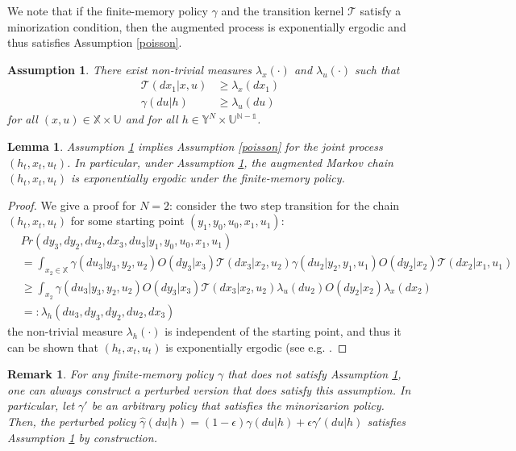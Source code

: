 \documentclass[11pt]{article}
\newtheorem{assumption}{Assumption}
\newtheorem{remark}{Remark}
\newtheorem{lemma}{Lemma}
\begin{document}
We  note that if the finite-memory policy $\gamma$ and the transition kernel $\mathcal{T}$ satisfy a minorization condition, then the augmented process is exponentially ergodic and thus satisfies Assumption \ref{poisson}.
\begin{assumption}\label{minor}
There exist non-trivial measures $\lambda_x(\cdot)$ and  $\lambda_u(\cdot)$ such that 
\begin{align*}
\mathcal{T}(dx_1|x,u)&\geq\lambda_x(dx_1)\\
\gamma(du|h)&\geq \lambda_u(du)
\end{align*}
for all $(x,u)\in\mathds{X}\times\mathds{U}$ and for all $h\in \mathds{Y}^{N}\times \mathds{U^{N-1}}$.
\end{assumption}
\begin{lemma}
Assumption \ref{minor} implies Assumption \ref{poisson} for the joint process $(h_t,x_t,u_t)$. In particular, under Assumption \ref{minor}, the augmented Markov chain $(h_t,x_{t},u_t)$ is exponentially ergodic under the finite-memory policy.
\end{lemma}
\begin{proof}
We give a proof for $N=2$: consider the two step transition for the chain $(h_t,x_{t},u_t)$ for some starting point $(y_1,y_0,u_0,x_1,u_1)$:
\begin{align*}
&Pr(dy_3, dy_2,du_2,dx_3,du_3|y_1,y_0,u_0,x_1,u_1)\\
&=\int_{x_2\in\mathds{X}} \gamma(du_3|y_3,y_2,u_2)O(dy_3|x_3)\mathcal{T}(dx_3|x_2,u_2)\gamma(du_2|y_2,y_1,u_1) O(dy_2|x_2) \mathcal{T}(dx_2|x_1,u_1)\\
&\geq \int_{x_2} \gamma(du_3|y_3,y_2,u_2)O(dy_3|x_3)\mathcal{T}(dx_3|x_2,u_2)\lambda_u(du_2)O(dy_2|x_2) \lambda_x(dx_2)\\
&=:\lambda_h(du_3,dy_3, dy_2,du_2,dx_3)
\end{align*}
the non-trivial measure $\lambda_h(\cdot)$  is independent of the starting point, and thus it can be shown that $(h_t,x_{t},u_t)$ is exponentially ergodic (see e.g.  \cite[Lemma 3.3]{hernandez2012adaptive}.
\end{proof}
\begin{remark}
For any finite-memory policy $\gamma$ that does not satisfy Assumption \ref{minor}, one can always construct a perturbed version that does satisfy this assumption. In particular, let $\gamma'$ be an arbitrary policy that satisfies the minorizarion policy. Then, the perturbed policy $\hat{\gamma}(du|h)=(1-\epsilon)\gamma(du|h)+\epsilon \gamma'(du|h)$ satisfies Assumption \ref{minor} by construction.
\end{remark}
\end{document}
